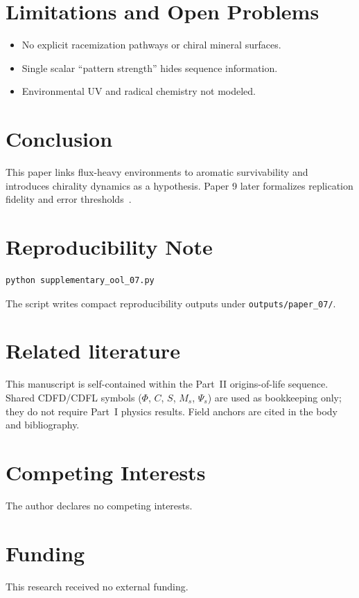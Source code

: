 \documentclass[11pt,a4paper]{article}
\begin{document}
\section{Limitations and Open Problems}
\begin{itemize}
\item No explicit racemization pathways or chiral mineral surfaces.
\item Single scalar ``pattern strength'' hides sequence information.
\item Environmental UV and radical chemistry not modeled.
\end{itemize}

\section{Conclusion}
This paper links flux-heavy environments to aromatic survivability and introduces chirality dynamics as a hypothesis. Paper 9 later formalizes replication fidelity and error thresholds~\cite{Orgel1963,Eigen1971}.

\section{Reproducibility Note}
\begin{verbatim}
python supplementary_ool_07.py
\end{verbatim}
The script writes compact reproducibility outputs under \texttt{outputs/paper\_07/}.

\section*{Related literature}
This manuscript is self-contained within the Part~II origins-of-life sequence. Shared CDFD/CDFL symbols ($\Phi$, $C$, $S$, $M_s$, $\Psi_s$) are used as bookkeeping only; they do not require Part~I physics results. Field anchors are cited in the body and bibliography.

\section*{Competing Interests}
The author declares no competing interests.

\section*{Funding}
This research received no external funding.
\end{document}
